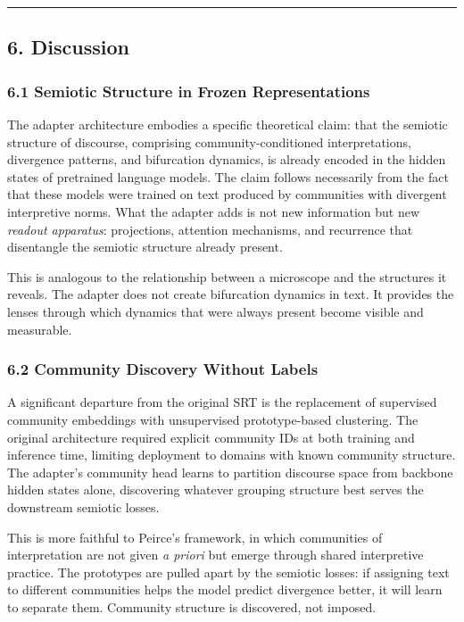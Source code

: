 \documentclass[
  11pt]{article}
\begin{document}
\begin{center}\rule{0.5\linewidth}{0.5pt}\end{center}

\subsection{6. Discussion}\label{discussion}

\subsubsection{6.1 Semiotic Structure in Frozen
Representations}\label{semiotic-structure-in-frozen-representations}

The adapter architecture embodies a specific theoretical claim: that the
semiotic structure of discourse, comprising community-conditioned
interpretations, divergence patterns, and bifurcation dynamics, is
already encoded in the hidden states of pretrained language models. The
claim follows necessarily from the fact that these models were trained
on text produced by communities with divergent interpretive norms. What
the adapter adds is not new information but new \emph{readout
apparatus}: projections, attention mechanisms, and recurrence that
disentangle the semiotic structure already present.

This is analogous to the relationship between a microscope and the
structures it reveals. The adapter does not create bifurcation dynamics
in text. It provides the lenses through which dynamics that were always
present become visible and measurable.

\subsubsection{6.2 Community Discovery Without
Labels}\label{community-discovery-without-labels}

A significant departure from the original SRT is the replacement of
supervised community embeddings with unsupervised prototype-based
clustering. The original architecture required explicit community IDs at
both training and inference time, limiting deployment to domains with
known community structure. The adapter's community head learns to
partition discourse space from backbone hidden states alone, discovering
whatever grouping structure best serves the downstream semiotic losses.

This is more faithful to Peirce's framework, in which communities of
interpretation are not given \emph{a priori} but emerge through shared
interpretive practice. The prototypes are pulled apart by the semiotic
losses: if assigning text to different communities helps the model
predict divergence better, it will learn to separate them. Community
structure is discovered, not imposed.
\end{document}
